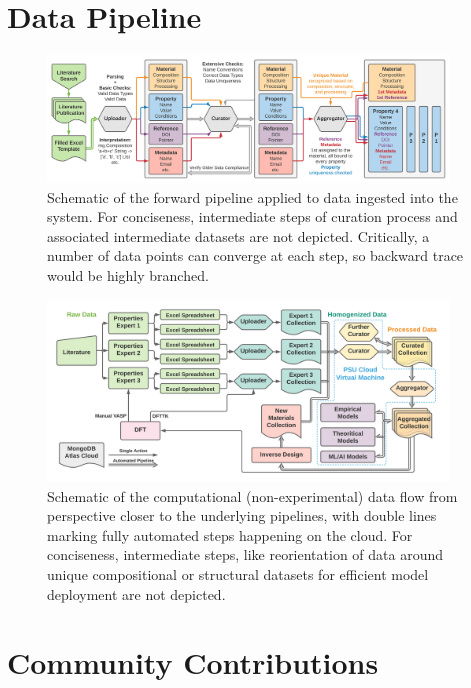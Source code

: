 \section{Data Pipeline} \label{ultera:sec:pipeline}

\todo

\begin{figure}[H]
    \centering
    \includegraphics[width=0.95\textwidth]{ultera/ULTERA Data Detail.png}
    \caption{Schematic of the forward pipeline applied to data ingested into the system. For conciseness, intermediate steps of curation process and associated intermediate datasets are not depicted. Critically, a number of data points can converge at each step, so backward trace would be highly branched.}
    \label{ultera:fig:datapipeline}
\end{figure}


\begin{figure}[H]
    \centering
    \includegraphics[width=0.95\textwidth]{ultera/ULTERA_Data_Cycle_v2.png}
    \caption{Schematic of the computational (non-experimental) data flow from perspective closer to the underlying pipelines, with double lines marking fully automated steps happening on the cloud. For conciseness, intermediate steps, like reorientation of data around unique compositional or structural datasets for efficient model deployment are not depicted.}
    \label{ultera:fig:datacycles}
\end{figure}




\section{Community Contributions} \label{ultera:sec:contributions}

